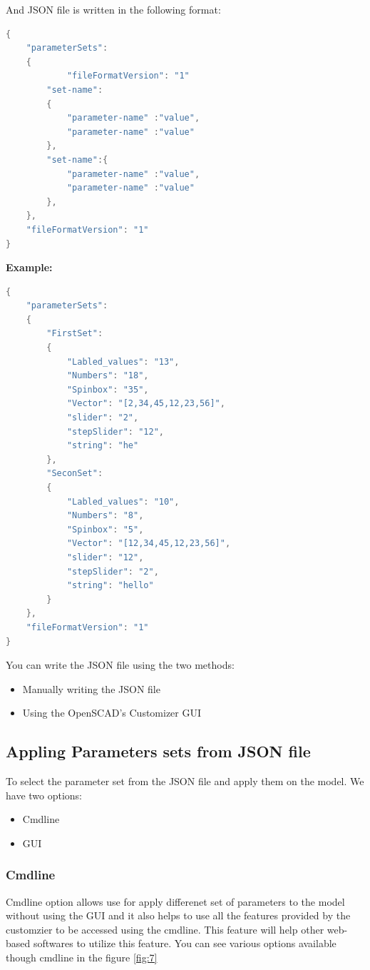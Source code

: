 And JSON file is written in the following format:

\begin{lstlisting}[language=Java]
{
    "parameterSets":
    {
            "fileFormatVersion": "1"
        "set-name":
        {
            "parameter-name" :"value",
            "parameter-name" :"value"
        },
        "set-name":{
            "parameter-name" :"value",
            "parameter-name" :"value"
        },
    },
    "fileFormatVersion": "1"
}
\end{lstlisting}

\textbf{Example:}
\begin{lstlisting}[language=Java]
{
    "parameterSets":
    {
        "FirstSet":
        {
            "Labled_values": "13",
            "Numbers": "18",
            "Spinbox": "35",
            "Vector": "[2,34,45,12,23,56]",
            "slider": "2",
            "stepSlider": "12",
            "string": "he"
        },
        "SeconSet":
        {
            "Labled_values": "10",
            "Numbers": "8",
            "Spinbox": "5",
            "Vector": "[12,34,45,12,23,56]",
            "slider": "12",
            "stepSlider": "2",
            "string": "hello"
        }
    },
    "fileFormatVersion": "1"
}
\end{lstlisting}

You can write the JSON file using the two methods:
\begin{itemize}
    \item Manually writing the JSON file
    \item Using the OpenSCAD's Customizer GUI
\end{itemize}

\subsection{Appling Parameters sets from JSON file}
To select the parameter set from the JSON file and apply them on the model. We have two options:

\begin{itemize}
    \item Cmdline
    \item GUI
\end{itemize}

\subsubsection{Cmdline}
Cmdline option allows use for apply differenet set of parameters to the model without using the GUI and it also helps to use all the features provided by the customzier to be accessed using the cmdline. This feature will help other web-based softwares to utilize this feature. You can see various options available though cmdline in the figure \ref{fig:7}
 

